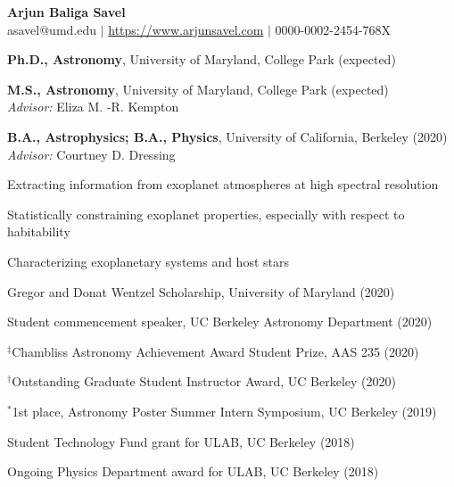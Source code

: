 \documentclass[12pt,letterpaper]{article}
\begin{document}
\thispagestyle{empty}\sloppy\sloppypar\raggedbottom
\centering
\textbf{\Large Arjun Baliga Savel} \hfill \\
\textsf{\small asavel@umd.edu $|$ \href{https://www.arjunsavel.com}{https://www.arjunsavel.com} $|$ 0000-0002-2454-768X}\\
\raggedright

\begin{list}{}{\cvlist}
\item
\textbf{Ph.D., Astronomy}, University of Maryland, College Park (expected)
\item
\textbf{M.S., Astronomy}, University of Maryland, College Park (expected)
\\\textit{Advisor:} Eliza M. -R. Kempton
\item
\textbf{B.A., Astrophysics; B.A., Physics}, University of California, Berkeley (2020) \\\textit{Advisor:} Courtney D. Dressing
\end{list}

\begin{list}{}{\cvlist}

\item Extracting information from exoplanet atmospheres at high spectral resolution
\item Statistically constraining exoplanet properties, especially with respect to habitability
\item Characterizing exoplanetary systems and host stars

\end{list}


  

  \begin{list}{}{\cvlist}
    
  \end{list}

  \begin{list}{}{\cvlist}
    
  \end{list}


\begin{list}{}{\cvlist}

\item Gregor and Donat Wentzel Scholarship, University of Maryland (2020)
\item Student commencement speaker, UC Berkeley Astronomy Department (2020)
\item $^\ddagger$Chambliss Astronomy Achievement Award Student Prize, AAS 235 (2020)
\item $^\dagger$Outstanding Graduate Student Instructor Award, UC Berkeley (2020)
\item $^*$1st place, Astronomy Poster Summer Intern Symposium, UC Berkeley (2019)
\item Student Technology Fund grant for ULAB, UC Berkeley (2018)
\item Ongoing Physics Department award for ULAB, UC Berkeley (2018)

\end{list}
\end{document}

